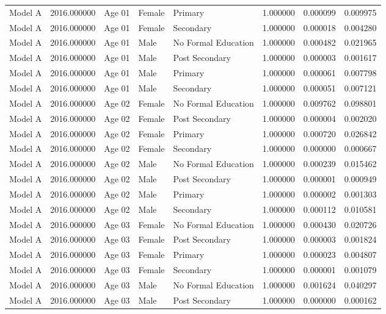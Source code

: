 \begin{table}[ht]
\begin{tabular}{lrlllrrr}
Model A & 2016.000000 & Age 01 & Female & Primary & 1.000000 & 0.000099 & 0.009975 \\
Model A & 2016.000000 & Age 01 & Female & Secondary & 1.000000 & 0.000018 & 0.004280 \\
Model A & 2016.000000 & Age 01 & Male & No Formal Education & 1.000000 & 0.000482 & 0.021965 \\
Model A & 2016.000000 & Age 01 & Male & Post Secondary & 1.000000 & 0.000003 & 0.001617 \\
Model A & 2016.000000 & Age 01 & Male & Primary & 1.000000 & 0.000061 & 0.007798 \\
Model A & 2016.000000 & Age 01 & Male & Secondary & 1.000000 & 0.000051 & 0.007121 \\
Model A & 2016.000000 & Age 02 & Female & No Formal Education & 1.000000 & 0.009762 & 0.098801 \\
Model A & 2016.000000 & Age 02 & Female & Post Secondary & 1.000000 & 0.000004 & 0.002020 \\
Model A & 2016.000000 & Age 02 & Female & Primary & 1.000000 & 0.000720 & 0.026842 \\
Model A & 2016.000000 & Age 02 & Female & Secondary & 1.000000 & 0.000000 & 0.000667 \\
Model A & 2016.000000 & Age 02 & Male & No Formal Education & 1.000000 & 0.000239 & 0.015462 \\
Model A & 2016.000000 & Age 02 & Male & Post Secondary & 1.000000 & 0.000001 & 0.000949 \\
Model A & 2016.000000 & Age 02 & Male & Primary & 1.000000 & 0.000002 & 0.001303 \\
Model A & 2016.000000 & Age 02 & Male & Secondary & 1.000000 & 0.000112 & 0.010581 \\
Model A & 2016.000000 & Age 03 & Female & No Formal Education & 1.000000 & 0.000430 & 0.020726 \\
Model A & 2016.000000 & Age 03 & Female & Post Secondary & 1.000000 & 0.000003 & 0.001824 \\
Model A & 2016.000000 & Age 03 & Female & Primary & 1.000000 & 0.000023 & 0.004807 \\
Model A & 2016.000000 & Age 03 & Female & Secondary & 1.000000 & 0.000001 & 0.001079 \\
Model A & 2016.000000 & Age 03 & Male & No Formal Education & 1.000000 & 0.001624 & 0.040297 \\
Model A & 2016.000000 & Age 03 & Male & Post Secondary & 1.000000 & 0.000000 & 0.000162 \\

\end{tabular}
\end{table}
